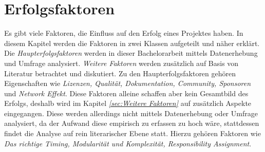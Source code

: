 \chapter{Erfolgsfaktoren}


Es gibt viele Faktoren, die Einfluss auf den Erfolg eines Projektes haben. 
In diesem Kapitel werden die Faktoren in zwei Klassen aufgeteilt und näher erklärt.
Die \textit{Haupterfolgsfaktoren} werden in dieser Bachelorarbeit mittels Datenerhebung und
Umfrage analysiert. 
\textit{Weitere Faktoren} werden zusätzlich auf Basis von Literatur betrachtet und diskutiert.
Zu den Haupterfolgsfaktoren gehören Eigenschaften wie \textit{Lizenzen, Qualität, Dokumentation, Community,
Sponsoren} und \textit{Network Effekt}. %
Diese Faktoren alleine schaffen aber kein Gesamtbild des Erfolgs, deshalb wird im Kapitel 
\textit{\ref{sec:Weitere Faktoren}} auf zusätzlich Aspekte eingegangen.
Diese werden allerdings nicht mittels Datenerhebung oder Umfrage analysiert, da der Aufwand
diese empirisch zu erfassen zu hoch wäre, stattdessen findet die Analyse auf rein literarischer Ebene statt. 
Hierzu gehören Faktoren wie \textit{Das richtige Timing, Modularität und Komplexität, Responsibility
Assignment}.%








